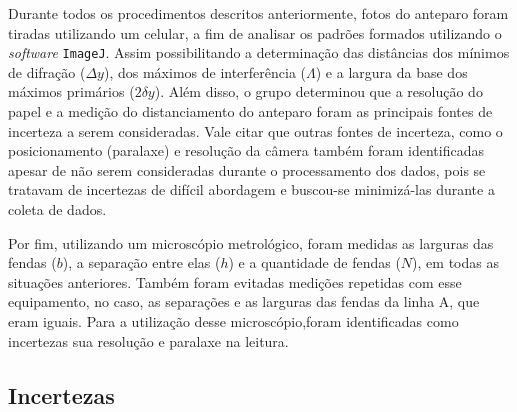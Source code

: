 Durante todos os procedimentos descritos anteriormente, fotos do anteparo foram tiradas utilizando um celular, a fim de analisar os padrões formados utilizando o \textit{software} \texttt{ImageJ}\cite{ref:imagej}. Assim possibilitando a determinação das distâncias dos mínimos de difração ($\Delta y$), dos máximos de interferência ($\Lambda$) e a largura da base dos máximos primários ($2 \delta y$). Além disso, o grupo determinou que a resolução do papel e a medição do distanciamento do anteparo foram as principais fontes de incerteza a serem consideradas. Vale citar que outras fontes de incerteza, como o posicionamento (paralaxe) e resolução da câmera também foram identificadas apesar de não serem consideradas durante o processamento dos dados, pois se tratavam de incertezas de difícil abordagem e buscou-se minimizá-las durante a coleta de dados.

Por fim, utilizando um microscópio metrológico, foram medidas as larguras das fendas ($b$), a separação entre elas ($h$) e a quantidade de fendas ($N$), em todas as situações anteriores. Também foram evitadas medições repetidas com esse equipamento, no caso, as separações e as larguras das fendas da linha A, que eram iguais. Para a utilização desse microscópio,foram identificadas como incertezas sua resolução e paralaxe na leitura.

\subsection{Incertezas}
    
